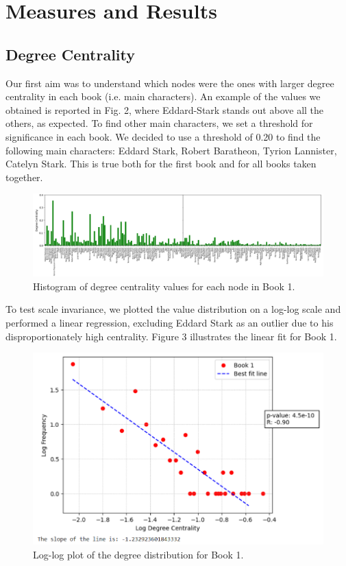\documentclass[12pt, a4paper]{article}
\begin{document}
\section{Measures and Results}
\label{measures}
\subsection{Degree Centrality}
\label{degree centrality}
Our first aim was to understand which nodes were the ones with larger degree centrality in each book (i.e. main characters). An example of the values we obtained is reported in Fig. 2, where Eddard-Stark stands out above all the others, as expected. To find other main characters, we set a threshold for significance in each book. We decided to use a threshold of 0.20 to find the following main characters: Eddard Stark, Robert Baratheon, Tyrion Lannister, Catelyn Stark. This is true both for the first book and for all books taken together.

\begin{figure}[H]
    \centering
    \includegraphics[width=1\linewidth]{book_1_main_character.png}
    \caption{Histogram of degree centrality values for each node in Book 1.}
    \label{fig:enter-label}
\end{figure}

To test scale invariance, we plotted the value distribution on a log-log scale and performed a linear regression, excluding Eddard Stark as an outlier due to his disproportionately high centrality. Figure 3 illustrates the linear fit for Book 1.

\begin{figure}[H]
    \centering
    \includegraphics[width=0.5\linewidth]{Log-log plot of the degree distribution for Book 1.png}
    \caption{Log-log plot of the degree distribution for Book 1.}
    \label{fig:enter-label}
\end{figure}
\end{document}
